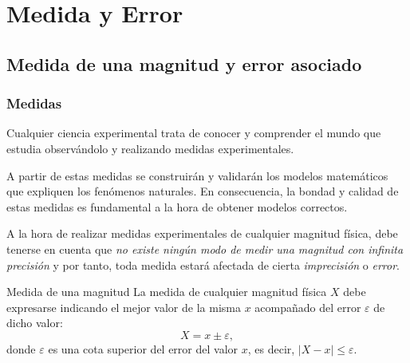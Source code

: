 \section{Medida y Error}


\subsection{Medida de una magnitud y error asociado}
\begin{frame}
	\frametitle{Medidas}
	Cualquier ciencia experimental trata de conocer y comprender el mundo que estudia observándolo y realizando medidas
	experimentales.
	
	A partir de estas medidas se construirán y validarán los modelos matemáticos que expliquen los fenómenos naturales. En
	consecuencia, la bondad y calidad de estas medidas es fundamental a la hora de obtener modelos correctos.
	
	A la hora de realizar medidas experimentales de cualquier magnitud física, debe tenerse en cuenta que \emph{no existe
	ningún modo de medir una magnitud con infinita precisión} y por tanto, toda medida estará afectada de cierta
	\emph{imprecisión} o \emph{error}.
	
	\begin{block}{Medida de una magnitud}
		La medida de cualquier magnitud física $X$ debe expresarse indicando el mejor valor de la misma $x$ acompañado
		del error $\varepsilon$ de dicho valor:
		\[
			X = x\pm \varepsilon,
		\]
		donde $\varepsilon$ es una cota superior del error del valor $x$, es decir, $|X-x|\leq \varepsilon$.
	\end{block}
\end{frame}


